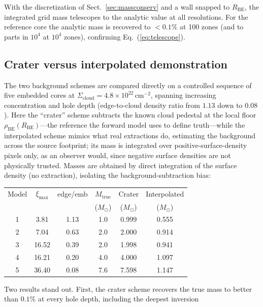 \documentclass[11pt,a4paper]{article}
\newcommand{\msun}{M_{\odot}}
\newcommand{\Rbe}{R_{\mathrm{BE}}}
\newcommand{\ximax}{\xi_{\mathrm{max}}}
\newcommand{\Scloud}{\Sigma_{\mathrm{cloud}}}
\begin{document}
With the discretization of Sect.~\ref{sec:massconserv} and a wall snapped to
$\Rbe$, the integrated grid mass telescopes to the analytic value at all
resolutions. For the reference core the analytic mass is recovered to
$<0.1\%$ at 100 zones (and to parts in $10^{4}$ at $10^{4}$ zones),
confirming Eq.~(\ref{eq:telescope}). 

\subsection{Crater versus interpolated demonstration}
\label{sec:cratervsinterp}

The two background schemes are compared directly on a controlled sequence of
five embedded cores at $\Scloud=4.8\times10^{22}\,\mathrm{cm^{-2}}$, spanning
increasing concentration and hole depth (edge-to-cloud density ratio from
$1.13$ down to $0.08$). Here the ``crater'' scheme subtracts the known cloud
pedestal at the local floor $\rho_{\mathrm{BE}}(\Rbe)$---the reference the
forward model uses to define truth---while the interpolated scheme mimics what
real extractions do, estimating the background across the source footprint;
its mass is integrated over positive-surface-density pixels only, as an
observer would, since negative surface densities are not physically trusted.
Masses are obtained by direct integration of the surface density (no
extraction), isolating the background-subtraction bias:
\begin{center}
\begin{tabular}{cccccc}
\hline
Model & $\ximax$ & edge/emb & $M_{\mathrm{true}}$ & Crater & Interpolated\\
      &          &          & ($\msun$)           & ($\msun$) & ($\msun$)\\
\hline
1 &  3.81 & 1.13 & 1.0 & 0.999 & 0.555 \\
2 &  7.04 & 0.63 & 2.0 & 2.000 & 0.914 \\
3 & 16.52 & 0.39 & 2.0 & 1.998 & 0.941 \\
4 & 16.21 & 0.20 & 4.0 & 4.000 & 1.097 \\
5 & 36.40 & 0.08 & 7.6 & 7.598 & 1.147 \\
\hline
\end{tabular}
\end{center}
Two results stand out. First, the crater scheme recovers the true mass to
better than $0.1\%$ at every hole depth, including the deepest inversion
\end{document}
